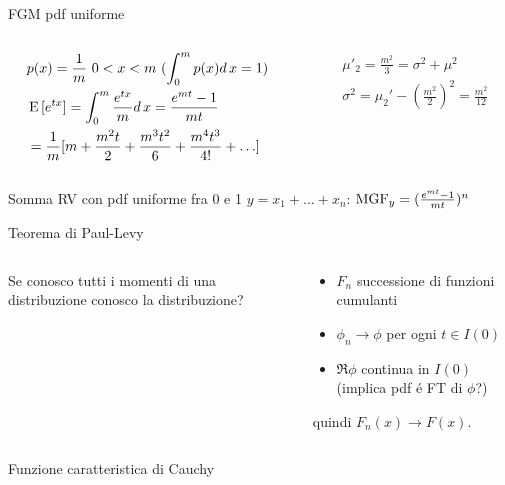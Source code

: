 \begin{wordonframe}{FGM pdf uniforme}
\begin{columns}[T]
\begin{column}{0.5\textwidth}
\begin{align*}
&p(x)=\frac{1}{m}\ 0<x<m\ (\int_0^mp(x)d\,x=1)\\
&\operatorname{E}{[e^{tx}]}=\int_0^m\frac{e^{tx}}{m}d\,x=\frac{e^{mt}-1}{mt}\\
&=\frac{1}{m}[m+\frac{m^2t}{2}+\frac{m^3t^2}{6}+\frac{m^4t^3}{4!}+\ldots]
\end{align*}
\end{column}
\begin{column}{0.5\textwidth}
\begin{align*}
&\mu'_2=\frac{m^2}{3}=\sigma^2+\mu^2\\
&\sigma^2=\mu_2'-(\frac{m^2}{2})^2=\frac{m^2}{12}
\end{align*}
\end{column}
\end{columns}
\begin{block}{Somma RV con pdf uniforme fra 0 e 1}
$y=x_1+\ldots+x_n$: $\operatorname{MGF}_y=(\frac{e^{mt}-1}{mt})^n$
\end{block}
\end{wordonframe}

\begin{frame}{Teorema di Paul-Levy}
	\begin{columns}[T]
		\begin{column}{0.3\textwidth}
			Se conosco tutti i momenti di una distribuzione conosco la distribuzione?
		\end{column}
		\begin{column}{0.7\textwidth}
			\begin{itemize}
				\item $F_n$ successione di funzioni cumulanti
				\item $\phi_n\to\phi$ per ogni $t\in I(0)$
				\item $\Re{\phi}$ continua in $I(0)$ (implica pdf \'e FT di $\phi$?)
			\end{itemize}
			quindi $F_n(x)\to F(x)$.
		\end{column}
	\end{columns}
\end{frame}

\begin{wordonframe}{Funzione caratteristica di Cauchy}

\end{wordonframe}



